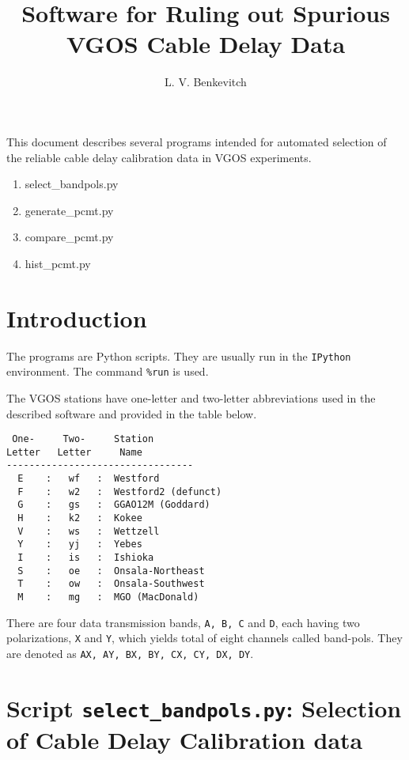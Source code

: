 \documentclass[preprint]{aastex}
\begin{document}
\title{Software for Ruling out Spurious VGOS Cable Delay Data}

\author{L. V. Benkevitch}

This document describes several programs intended for automated selection of the reliable cable delay calibration data in VGOS experiments. 

\begin{enumerate}
  \item select\_bandpols.py
  		
  \item generate\_pcmt.py
  \item compare\_pcmt.py
  \item hist\_pcmt.py
\end{enumerate}


\section{Introduction}

The programs are Python scripts. They are usually run in the \texttt{IPython} environment. The command \texttt{\%run} is used. 

The VGOS stations have one-letter and two-letter abbreviations used in the described software and provided in the table below. 
\begin{verbatim}
 One-     Two-     Station
Letter   Letter     Name
---------------------------------
  E    :   wf   :  Westford
  F    :   w2   :  Westford2 (defunct)
  G    :   gs   :  GGAO12M (Goddard)
  H    :   k2   :  Kokee
  V    :   ws   :  Wettzell
  Y    :   yj   :  Yebes
  I    :   is   :  Ishioka
  S    :   oe   :  Onsala-Northeast
  T    :   ow   :  Onsala-Southwest
  M    :   mg   :  MGO (MacDonald)
\end{verbatim}

There are four data transmission bands, \texttt{A, B, C} and \texttt{D}, each having two polarizations, \texttt{X} and \texttt{Y}, which yields total of eight channels called band-pols. They are denoted as \texttt{AX, AY, BX, BY, CX, CY, DX, DY}. 



\section{Script \texttt{select\_bandpols.py}: Selection of Cable Delay Calibration data}
\end{document}
